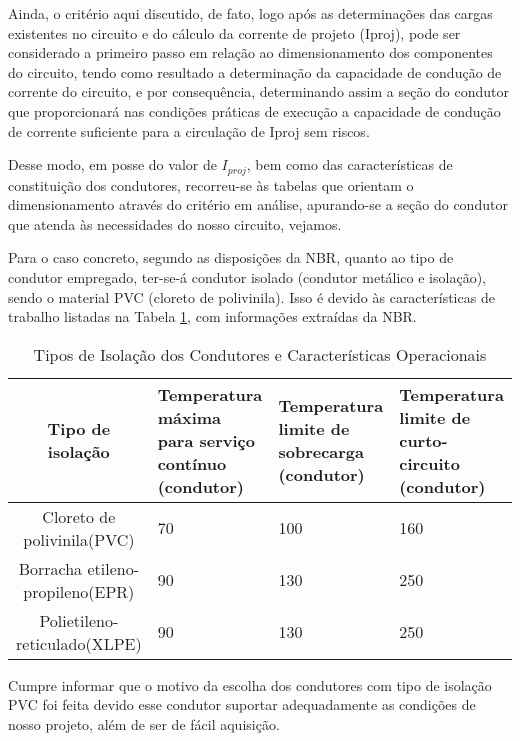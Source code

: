 Ainda, o critério aqui discutido, de fato, logo após as determinações das cargas existentes no circuito e do cálculo da corrente de projeto (Iproj), pode ser considerado a primeiro passo em relação ao dimensionamento dos componentes do circuito, tendo como resultado a determinação da capacidade de condução de corrente do circuito, e por consequência, determinando assim a seção do condutor que proporcionará nas condições práticas de execução a capacidade de condução de corrente suficiente para a circulação de Iproj sem riscos.

Desse modo, em posse do valor de $I_{proj}$, bem como das características de constituição dos condutores, recorreu-se às tabelas que orientam o dimensionamento através do critério em análise, apurando-se a seção do condutor que atenda às necessidades do nosso circuito, vejamos.

Para o caso concreto, segundo as disposições da NBR, quanto ao tipo de condutor empregado, ter-se-á condutor isolado (condutor metálico e isolação), sendo o material PVC (cloreto de polivinila). Isso é devido às características de trabalho listadas na Tabela \ref{nbr}, com informações extraídas da NBR.

\begin{table}[h]
\centering
\begin{tabular}{| c | p{3cm} | p{3cm} | p{3cm} |}
\hline
\rowcolor[HTML]{329A9D} 
Tipo de isolação                & Temperatura máxima para serviço contínuo (condutor) & Temperatura limite de sobrecarga (condutor) & Temperatura limite de curto-circuito (condutor) \\ \hline
Cloreto de polivinila(PVC)      & 70                                                 & 100                                        & 160                                            \\ \hline
Borracha etileno-propileno(EPR) & 90                                                 & 130                                        & 250                                            \\ \hline
Polietileno-reticulado(XLPE)    & 90                                                 & 130                                        & 250                                           
\\ \hline
\end{tabular}
\caption{Tipos de Isolação dos Condutores e Características Operacionais}
\label{nbr}
\end{table}

Cumpre informar que o motivo da escolha dos condutores com tipo de isolação PVC foi feita devido esse condutor suportar adequadamente as condições de nosso projeto, além de ser de fácil aquisição.

